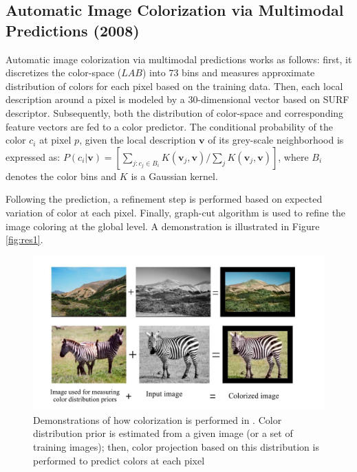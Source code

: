 \documentclass[10pt]{article}
\begin{document}
\subsection{Automatic Image Colorization via Multimodal Predictions (2008)}
Automatic image colorization via multimodal predictions \cite{charpiat2008automatic} works as follows: first, it discretizes the color-space ($LAB$) into $73$ bins and measures approximate distribution of colors for each pixel based on the training data. 
Then, each local description around a pixel is modeled by a $30$-dimensional vector based on SURF descriptor. 
Subsequently, both the distribution of color-space and corresponding feature vectors are fed to a color predictor. 
The conditional probability of the color $c_i$ at pixel $p$, given the local description
$\textbf{v}$ of its grey-scale neighborhood is expressed as: $P(c_i|\textbf{v}) = [\sum_{j:c_j \in B_i}{K(\textbf{v}_j, \textbf{v})} /  \sum_j {K(\textbf{v}_j, \textbf{v})} ]$, where $B_i$ denotes the color bins and $K$ is a Gaussian kernel.

Following the prediction, a refinement step is performed 
based on expected variation of color at each pixel. 
Finally, graph-cut algorithm is used to refine the image coloring at the global level. 
A demonstration is illustrated in Figure \ref{fig:res1}.

\begin{figure}[h]
\centering
\includegraphics[width=\linewidth]{Figs/52.pdf}
\vspace{-10mm}
\caption{Demonstrations of how colorization is performed in \cite{charpiat2008automatic}. Color distribution prior is estimated from a given image (or a set of training images); then, color projection based on this distribution is performed to predict colors at each pixel}
\label{fig:res2}
\end{figure} 
\end{document}
